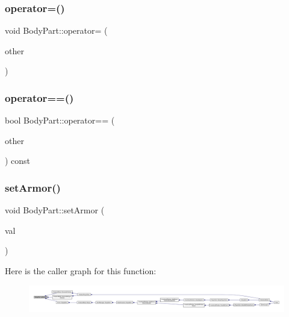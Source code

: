 \mbox{\label{class_body_part_af4df2320cea8651ff589a57778ba4eee}} 
\subsubsection{\texorpdfstring{operator=()}{operator=()}}
{\footnotesize\ttfamily void Body\+Part\+::operator= (\begin{DoxyParamCaption}\item[{const \mbox{\hyperlink{class_body_part}{Body\+Part}} \&}]{other }\end{DoxyParamCaption})}

\mbox{\label{class_body_part_a9fa30957d2740122ef8d3bf1905c2dda}} 
\subsubsection{\texorpdfstring{operator==()}{operator==()}}
{\footnotesize\ttfamily bool Body\+Part\+::operator== (\begin{DoxyParamCaption}\item[{\mbox{\hyperlink{class_body_part}{Body\+Part}} \&}]{other }\end{DoxyParamCaption}) const}

\mbox{\label{class_body_part_a089afe1bbd06d3fc84a9870ec173883c}} 
\subsubsection{\texorpdfstring{set\+Armor()}{setArmor()}}
{\footnotesize\ttfamily void Body\+Part\+::set\+Armor (\begin{DoxyParamCaption}\item[{\mbox{\hyperlink{class_armor}{Armor}}}]{val }\end{DoxyParamCaption})}

Here is the caller graph for this function\+:
\nopagebreak
\begin{figure}[H]
\begin{center}
\leavevmode
\includegraphics[width=350pt]{d2/d6f/class_body_part_a089afe1bbd06d3fc84a9870ec173883c_icgraph}
\end{center}
\end{figure}
\mbox{\label{class_body_part_a042e07259ce197a1077fe36660332a33}} 
